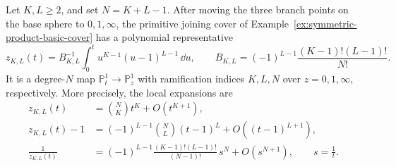 \begin{proposition}
\label{prop:symmetric-product-primitive-joining-cover-map}
Let \(K,L\ge2\), and set \(N=K+L-1\).  After moving the three branch
points on the base sphere to \(0,1,\infty\), the primitive joining cover of
Example~\ref{ex:symmetric-product-basic-cover} has a polynomial
representative
\begin{equation}
  z_{K,L}(t)
  =
  B_{K,L}^{-1}
  \int_0^t u^{K-1}(u-1)^{L-1}\,\dd u,
  \qquad
  B_{K,L}
  =
  (-1)^{L-1}\frac{(K-1)!(L-1)!}{N!}.
  \label{eq:symmetric-product-primitive-cover-map}
\end{equation}
It is a degree-\(N\) map \(\mathbb P^1_t\to\mathbb P^1_z\) with ramification
indices \(K,L,N\) over \(z=0,1,\infty\), respectively.  More precisely, the
local expansions are
\begin{align}
  z_{K,L}(t)
  &=
  \binom{N}{K}t^K+O(t^{K+1}),
  \label{eq:symmetric-product-primitive-cover-local-zero}\\
  z_{K,L}(t)-1
  &=
  (-1)^{L-1}\binom{N}{L}(t-1)^L+O((t-1)^{L+1}),
  \label{eq:symmetric-product-primitive-cover-local-one}\\
  \frac1{z_{K,L}(t)}
  &=
  (-1)^{L-1}
  \frac{(K-1)!(L-1)!}{(N-1)!}\,s^N+O(s^{N+1}),
  \qquad s=\frac1t .
  \label{eq:symmetric-product-primitive-cover-local-infinity}
\end{align}
\end{proposition}

